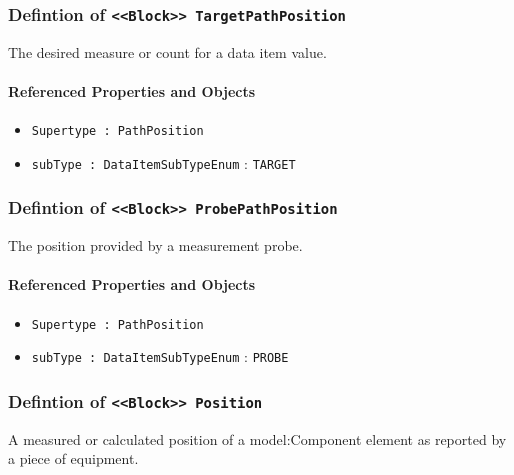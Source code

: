 \subsubsection{Defintion of \texttt{<<Block>> TargetPathPosition}}
  \label{type:TargetPathPosition}

\FloatBarrier

The desired measure or count for a data item value.

\FloatBarrier
\paragraph{Referenced Properties and Objects}

\begin{itemize}
\item \texttt{Supertype : PathPosition}

\item \texttt{subType : DataItemSubTypeEnum} : \texttt{TARGET}

\end{itemize}
\FloatBarrier
\subsubsection{Defintion of \texttt{<<Block>> ProbePathPosition}}
  \label{type:ProbePathPosition}

\FloatBarrier

The position provided by a measurement probe.

\FloatBarrier
\paragraph{Referenced Properties and Objects}

\begin{itemize}
\item \texttt{Supertype : PathPosition}

\item \texttt{subType : DataItemSubTypeEnum} : \texttt{PROBE}

\end{itemize}
\FloatBarrier
\subsubsection{Defintion of \texttt{<<Block>> Position}}
  \label{type:Position}

\FloatBarrier

A measured or calculated position of a {model:Component} element as reported by a piece of equipment.

